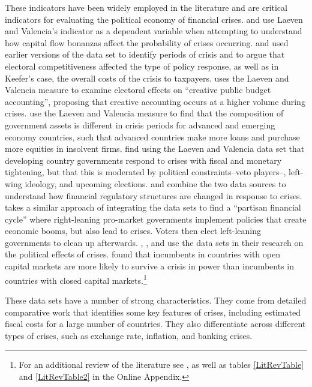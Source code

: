 \documentclass[]{article}
\begin{document}
These indicators have been widely employed in the literature and are critical indicators for evaluating the political economy of financial crises. \cite{Fielding2015} and \cite{Herrera2014} use Laeven and Valencia's indicator as a dependent variable when attempting to understand how capital flow bonanzas affect the probability of crises occurring. \cite{Keefer2007} and \cite{Rosas2006,Rosas2009} used earlier versions of the \cite{laeven2013} data set to identify periods of crisis and to argue that electoral competitiveness affected the type of policy response, as well as in Keefer's case, the overall costs of the crisis to taxpayers. \cite{reischmann2015} uses the Laeven and Valencia measure to examine electoral effects on ``creative public budget accounting'', proposing that creative accounting occurs at a higher volume during crises. \cite{seiferling2015} use the Laeven and Valencia measure to find that the composition of government assets is different in crisis periods for advanced and emerging economy countries, such that advanced countries make more loans and purchase more equities in insolvent firms. \cite{ha2015} find using the Laeven and Valencia data set that developing country governments respond to crises with fiscal and monetary tightening, but that this is moderated by political constraints--veto players--, left-wing ideology, and upcoming elections. \cite{Gandrud2013,Gandrud2014} and \cite{Kleibl2013} combine the two data sources to understand how financial regulatory structures are changed in response to crises. \cite{broz2013} takes a similar approach of integrating the data sets to find a ``partisan financial cycle'' where right-leaning pro-market governments implement policies that create economic booms, but also lead to crises. Voters then elect left-leaning governments to clean up afterwards. \cite{CrespoTenorio2014}, \cite{Chwieroth2013}, and \cite{Pepinsky2012} use the data sets in their research on the political effects of crises. \cite{CrespoTenorio2014} found that incumbents in countries with open capital markets are more likely to survive a crisis in power than incumbents in countries with closed capital markets.\footnote{For an additional review of the literature see \cite{GandrudHallerberg2015}, as well as tables \ref{LitRevTable} and \ref{LitRevTable2} in the Online Appendix.}

These data sets have a number of strong characteristics. They come from detailed comparative work that identifies some key features of crises, including estimated fiscal costs for a large number of countries. They also differentiate across different types of crises, such as exchange rate, inflation, and banking crises.
\end{document}

